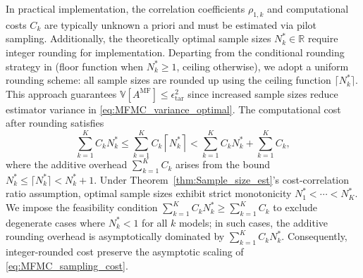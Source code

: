 In practical implementation, the correlation coefficients $\rho_{1,k}$ and computational costs $C_k$ are typically unknown a priori and must be estimated via pilot sampling. Additionally, the theoretically optimal sample sizes $N_k^* \in \mathbb{R}$ require integer rounding for implementation. Departing from the conditional rounding strategy in \cite{GrGuJuWa:2023, PeWiGu:2016} (floor function when $N_k^* \ge 1$, ceiling otherwise), we adopt a uniform rounding scheme: all sample sizes are rounded up using the ceiling function $\lceil N_k^* \rceil$. This approach guarantees $\mathbb{V}[A^{\mathrm{MF}}] \leq \epsilon_{\mathrm{tar}}^2$ since increased sample sizes reduce estimator variance in \eqref{eq:MFMC_variance_optimal}. The computational cost after rounding satisfies
%
\begin{equation}\label{eq:sampling_cost_bound}
    \sum_{k=1}^K C_k N_k^*\le \sum_{k=1}^K C_k \left\lceil N_k^*\right\rceil<\sum_{k=1}^K C_k N_k^* + \sum_{k=1}^K C_k,
\end{equation}
%
where the additive overhead $\sum_{k=1}^K C_k$ arises from the bound $N_k^*\le \lceil N_k^*\rceil< N_k^*+1$. Under Theorem~\ref{thm:Sample_size_est}'s cost-correlation ratio assumption, optimal sample sizes exhibit strict monotonicity $N_1^* < \cdots < N_K^*$. We impose the feasibility condition $\sum_{k=1}^K C_k N_k^* \geq \sum_{k=1}^K C_k$ to exclude degenerate cases where $N_k^* < 1$ for all $k$ models; in such cases, the additive rounding overhead is asymptotically dominated by $\sum_{k=1}^K C_k N_k^*$. Consequently, integer-rounded cost preserve the asymptotic scaling of \eqref{eq:MFMC_sampling_cost}.




